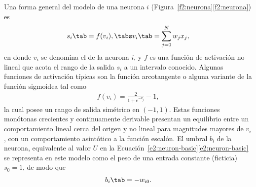 Una forma general del modelo de una neurona $i$
(\iflatexml{}Figura~\ref{f2:neurona}\else\autoref{f2:neurona}\fi)
es
%
\begin{align}\label{e2:neuron-general}
  s_i \tab = f(v_i), \tabs v_i \tab = \sum_{j=0}^N w_j x_j,
\end{align}
%
en donde $v_i$ se denomina el  de la neurona
$i$, y $f$ es una función de activación no lineal que acota el rango
de la salida $s_i$ a un intervalo conocido. Algunas funciones de
activación típicas son la función
arcotangente o alguna variante de la función sigmoidea
tal como
%
\begin{align}\label{e2:sigmoid-symmetric}
  f(v_i) = \frac{2}{1+e^{-v_j}}-1,
\end{align}
%
la cual posee un rango de salida simétrico en $(-1,1)$. Estas funciones
monótonas crecientes y continuamente derivable presentan un equilibrio
entre un comportamiento lineal cerca del origen y no lineal para
magnitudes mayores de $v_i$, con un comportamiento asintótico a la
función escalón. El umbral $b_i$ de la neurona,
equivalente al valor $U$ en la
\iflatexml{}Ecuación~\ref{e2:neuron-basic}\else\autoref{e2:neuron-basic}\fi
se representa en este modelo como el peso de una entrada
constante (ficticia) $s_0=1$, de modo que
%
\begin{align}
  b_i\tab=-w_{i0}.
\end{align}
%
